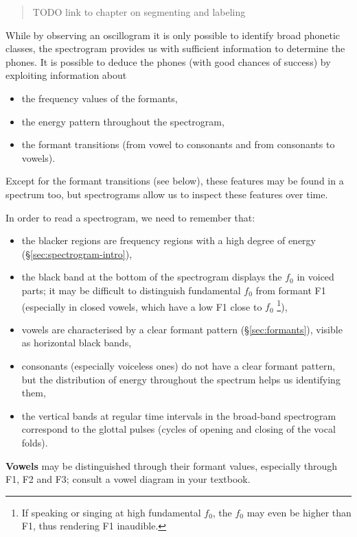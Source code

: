 \documentclass[
]{book}
\begin{document}
\begin{quote}
TODO link to chapter on segmenting and labeling
\end{quote}

While by observing an oscillogram it is only possible to identify broad phonetic classes, the spectrogram provides us with sufficient information to determine the phones. It is possible to deduce the phones (with good chances of success) by exploiting information about

\begin{itemize}
\item
  the frequency values of the formants,
\item
  the energy pattern throughout the spectrogram,
\item
  the formant transitions (from vowel to consonants and from consonants to vowels).
\end{itemize}

Except for the formant transitions (see below), these features may be found in a spectrum too, but spectrograms allow us to inspect these features over time.

In order to read a spectrogram, we need to remember that:

\begin{itemize}
\item
  the blacker regions are frequency regions with a high degree of energy (§\ref{sec:spectrogram-intro}),
\item
  the black band at the bottom of the spectrogram displays the \(f_0\) in voiced parts; it may be difficult to distinguish fundamental \(f_0\) from formant F1 (especially in closed vowels, which have a low F1 close to \(f_0\) \footnote{If speaking or singing at high fundamental \(f_0\), the \(f_0\) may even be higher than F1, thus rendering F1 inaudible.}),
\item
  vowels are characterised by a clear formant pattern (§\ref{sec:formants}), visible as horizontal black bands,
\item
  consonants (especially voiceless ones) do not have a clear formant pattern, but the distribution of energy throughout the spectrum helps us identifying them,
\item
  the vertical bands at regular time intervals in the broad-band spectrogram correspond to the glottal pulses (cycles of opening and closing of the vocal folds).
\end{itemize}

\textbf{Vowels} may be distinguished through their formant values, especially through F1, F2 and F3; consult a vowel diagram in your textbook.
\end{document}
